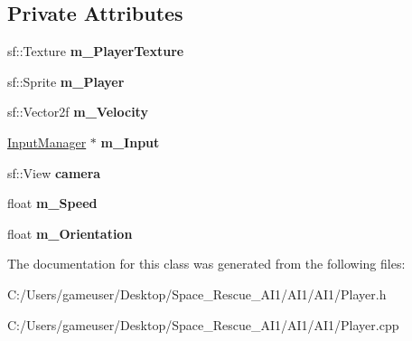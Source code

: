 \subsection*{Private Attributes}
\begin{DoxyCompactItemize}
\item 
\mbox{\label{class_player_adfdc54e041ca49b688e95fd791edbf25}} 
sf\+::\+Texture {\bfseries m\+\_\+\+Player\+Texture}
\item 
\mbox{\label{class_player_a7c4828acb3a8ea8b09e3362308af38a1}} 
sf\+::\+Sprite {\bfseries m\+\_\+\+Player}
\item 
\mbox{\label{class_player_a4685d5f23b58660ea60599ff84d274cc}} 
sf\+::\+Vector2f {\bfseries m\+\_\+\+Velocity}
\item 
\mbox{\label{class_player_adb65cc5d025215978cc52c482d3abf36}} 
\hyperlink{class_input_manager}{Input\+Manager} $\ast$ {\bfseries m\+\_\+\+Input}
\item 
\mbox{\label{class_player_a7e3921d083174337a845b7e975c1b23a}} 
sf\+::\+View {\bfseries camera}
\item 
\mbox{\label{class_player_a538a79c87eb315297fada7e32fc31ef1}} 
float {\bfseries m\+\_\+\+Speed}
\item 
\mbox{\label{class_player_ad569387f0161ec746d5a6843b0dd88a7}} 
float {\bfseries m\+\_\+\+Orientation}
\end{DoxyCompactItemize}


The documentation for this class was generated from the following files\+:\begin{DoxyCompactItemize}
\item 
C\+:/\+Users/gameuser/\+Desktop/\+Space\+\_\+\+Rescue\+\_\+\+A\+I1/\+A\+I1/\+A\+I1/Player.\+h\item 
C\+:/\+Users/gameuser/\+Desktop/\+Space\+\_\+\+Rescue\+\_\+\+A\+I1/\+A\+I1/\+A\+I1/Player.\+cpp\end{DoxyCompactItemize}
